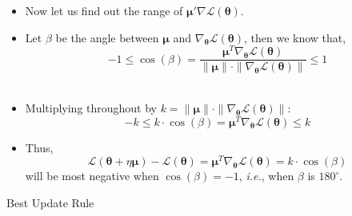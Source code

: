 \documentclass[10pt, aspectratio=169]{beamer}
\begin{document}
\begin{frame}
\begin{itemize}
\item Now let us find out the range of $\symbf{\mu}' \nabla \mathscr{L}(\symbf{\theta})$.
\end{itemize}
\end{frame}
\begin{frame}
\begin{itemize}
\item<1-> Let $\beta$ be the angle between $\symbf{\mu}$ and $\nabla_{\symbf{\theta}} \mathscr{L}(\symbf{\theta})$, then we know that,
\[
-1 \leq \cos(\beta) = \dfrac{\symbf{\mu}^T \nabla_{\symbf{\theta}} \mathscr{L}(\symbf{\theta})}{\|\symbf{\mu}\| \cdot \|\nabla_{\symbf{\theta}} \mathscr{L}(\symbf{\theta})\|} \leq 1
\] \\[0.5em]

\item<2-> Multiplying throughout by $k = \|\symbf{\mu}\| \cdot \|\nabla_{\symbf{\theta}} \mathscr{L}(\symbf{\theta})\|$:
\[
-k \leq k \cdot \cos(\beta) = \symbf{\mu}^T \nabla_{\symbf{\theta}} \mathscr{L}(\symbf{\theta}) \leq k
\]

\item<3-> Thus,
\[
\mathscr{L}(\symbf{\theta} + \eta \symbf{\mu}) - \mathscr{L}(\symbf{\theta}) = \symbf{\mu}^T \nabla_{\symbf{\theta}} \mathscr{L}(\symbf{\theta}) = k \cdot \cos(\beta)
\]
will be most negative when $\cos(\beta) = -1$, \textit{i.e.}, when $\beta$ is $180^\circ$.
\end{itemize}
\end{frame}


\begin{frame}
\begin{block}{Best Update Rule}
 \\[0.5em]
\end{block}

\end{frame}
\end{document}
